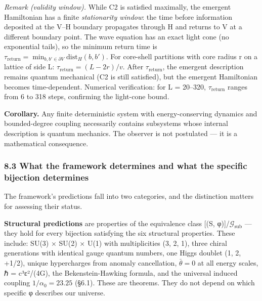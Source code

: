 \documentclass[
]{article}
\begin{document}
\emph{Remark (validity window).} While C2 is satisfied maximally, the
emergent Hamiltonian has a finite \emph{stationarity window}: the time
before information deposited at the V--H boundary propagates through H
and returns to V at a different boundary point. The wave equation has an
exact light cone (no exponential tails), so the minimum return time is
\(\tau_{\mathrm{return}} = \min_{b, b' \in \partial V} \mathrm{dist}_H(b, b')\).
For core-shell partitions with core radius r on a lattice of side L:
\(\tau_{\mathrm{return}} = (L - 2r)/v\). After
\(\tau_{\mathrm{return}}\), the emergent description remains quantum
mechanical (C2 is still satisfied), but the emergent Hamiltonian becomes
time-dependent. Numerical verification: for L = 20--320,
\(\tau_{\mathrm{return}}\) ranges from 6 to 318 steps, confirming the
light-cone bound.

\textbf{Corollary.} Any finite deterministic system with
energy-conserving dynamics and bounded-degree coupling necessarily
contains subsystems whose internal description is quantum mechanics. The
observer is not postulated --- it is a mathematical consequence.

\hypertarget{what-the-framework-determines-and-what-the-specific-bijection-determines}{%
\subsubsection{8.3 What the framework determines and what the specific
bijection
determines}\label{what-the-framework-determines-and-what-the-specific-bijection-determines}}

The framework's predictions fall into two categories, and the
distinction matters for assessing their status.

\textbf{Structural predictions} are properties of the equivalence class
{[}(S, φ){]}/\(\mathcal{G}_{\text{sub}}\) --- they hold for every
bijection satisfying the six structural properties. These include: SU(3)
× SU(2) × U(1) with multiplicities (3, 2, 1), three chiral generations
with identical gauge quantum numbers, one Higgs doublet (1, 2, +1/2),
unique hypercharges from anomaly cancellation, \(\bar{\theta} = 0\) at
all energy scales, ℏ = c³ε²/(4G), the Bekenstein-Hawking formula, and
the universal induced coupling \(1/\alpha_0 = 23.25\) (§6.1). These are
theorems. They do not depend on which specific φ describes our universe.
\end{document}
